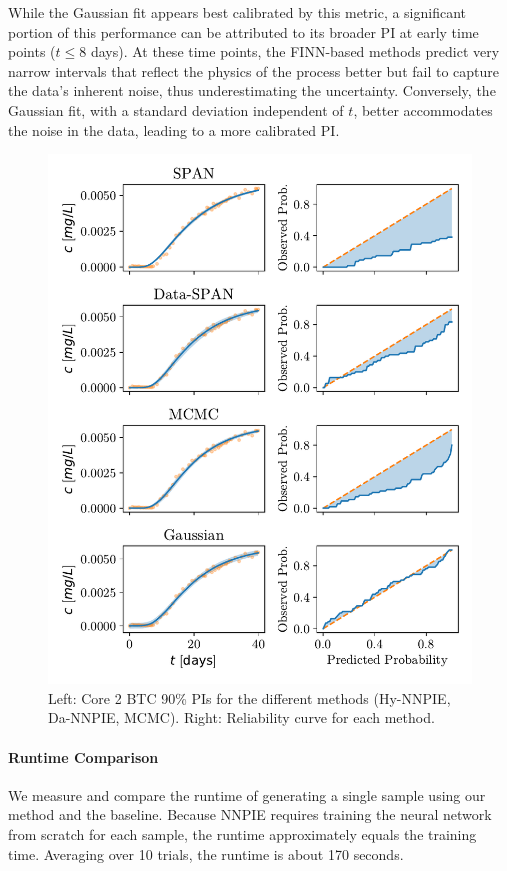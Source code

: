 While the Gaussian fit appears best calibrated by this metric, a significant portion of this performance can be attributed to its broader PI at early time points ($t \leq 8$ days). At these time points, the FINN-based methods predict very narrow intervals that reflect the physics of the process better but fail to capture the data's inherent noise, thus underestimating the uncertainty. Conversely, the Gaussian fit, with a standard deviation independent of $t$, better accommodates the noise in the data, leading to a more calibrated PI.

\begin{figure}[h]
    \centering
    \includegraphics{figs/reliability_curves.pdf}
    \caption{Left: Core 2 BTC 90\% PIs for the different methods (Hy-NNPIE, Da-NNPIE, MCMC). Right: Reliability curve for each method.}
    \label{fig:reliability_curves}
\end{figure}


\paragraph{Runtime Comparison}
We measure and compare the runtime of generating a single sample using our method and the baseline. Because NNPIE requires training the neural network from scratch for each sample, the runtime approximately equals the training time. Averaging over 10 trials, the runtime is about 170 seconds.

